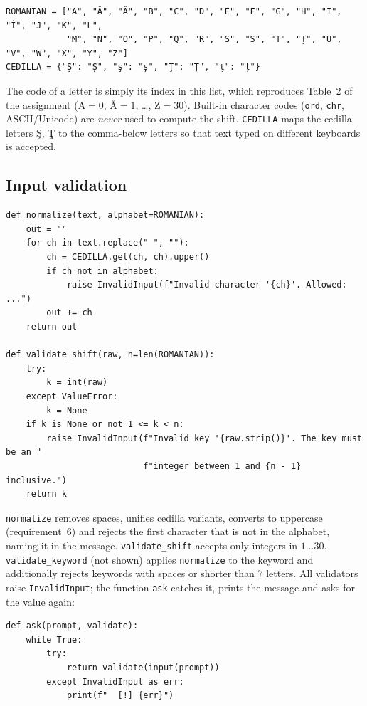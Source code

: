 \documentclass[12pt,a4paper]{article}
\newcommand{\code}[1]{\texttt{\small #1}}
\begin{document}
\begin{lstlisting}
ROMANIAN = ["A", "Ă", "Â", "B", "C", "D", "E", "F", "G", "H", "I", "Î", "J", "K", "L",
            "M", "N", "O", "P", "Q", "R", "S", "Ș", "T", "Ț", "U", "V", "W", "X", "Y", "Z"]
CEDILLA = {"Ş": "Ș", "ş": "ș", "Ţ": "Ț", "ţ": "ț"}
\end{lstlisting}
The code of a letter is simply its index in this list, which reproduces Table~2 of
the assignment ($\text{A}=0$, $\text{\u{A}}=1$, \dots, $\text{Z}=30$). Built-in
character codes (\code{ord}, \code{chr}, ASCII/Unicode) are \emph{never} used to
compute the shift. \code{CEDILLA} maps the cedilla letters \c{S}, \c{T} to the
comma-below letters so that text typed on different keyboards is accepted.

\subsection{Input validation}

\begin{lstlisting}
def normalize(text, alphabet=ROMANIAN):
    out = ""
    for ch in text.replace(" ", ""):
        ch = CEDILLA.get(ch, ch).upper()
        if ch not in alphabet:
            raise InvalidInput(f"Invalid character '{ch}'. Allowed: ...")
        out += ch
    return out

def validate_shift(raw, n=len(ROMANIAN)):
    try:
        k = int(raw)
    except ValueError:
        k = None
    if k is None or not 1 <= k < n:
        raise InvalidInput(f"Invalid key '{raw.strip()}'. The key must be an "
                           f"integer between 1 and {n - 1} inclusive.")
    return k
\end{lstlisting}
\code{normalize} removes spaces, unifies cedilla variants, converts to uppercase
(requirement~6) and rejects the first character that is not in the alphabet,
naming it in the message. \code{validate\_shift} accepts only integers in
$1\dots30$. \code{validate\_keyword} (not shown) applies \code{normalize} to the
keyword and additionally rejects keywords with spaces or shorter than $7$ letters.
All validators raise \code{InvalidInput}; the function \code{ask} catches it, prints
the message and asks for the value again:
\begin{lstlisting}
def ask(prompt, validate):
    while True:
        try:
            return validate(input(prompt))
        except InvalidInput as err:
            print(f"  [!] {err}")
\end{lstlisting}
\end{document}
